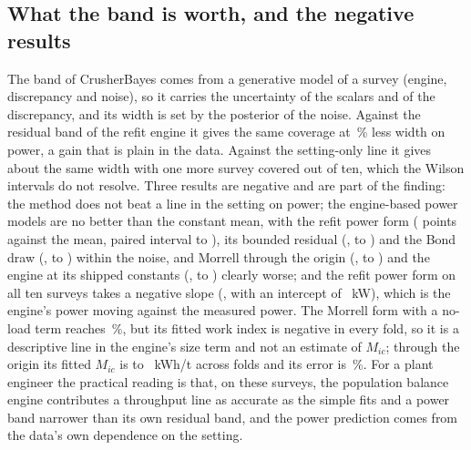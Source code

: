 \documentclass[journal]{IEEEtran}
\newcommand{\pct}{\,\%}
\begin{document}
\subsection{What the band is worth, and the negative results}

The band of CrusherBayes comes from a generative model of a survey (engine, discrepancy and noise), so it carries the
uncertainty of the scalars and of the discrepancy, and its width is set by the posterior of the noise. Against the
residual band of the refit engine it gives the same coverage at \widthRedKw\pct{} less width on power, a gain that is plain
in the data. Against the setting-only line it gives about the same width with one more survey covered out of ten, which
the Wilson intervals do not resolve. Three results are negative and are part of the finding: the method does not beat a
line in the setting on power; the engine-based power models are no better than the constant mean, with the refit power
form (\vsConstBackKw{} points against the mean, paired interval \vsConstBackKwLo{} to \vsConstBackKwHi), its bounded
residual (\vsConstResidKw, \vsConstResidKwLo{} to \vsConstResidKwHi) and the Bond draw (\vsConstBondKw, \vsConstBondKwLo{}
to \vsConstBondKwHi) within the noise, and Morrell through the origin (\vsConstMorKw, \vsConstMorKwLo{} to
\vsConstMorKwHi) and the engine at its shipped constants (\vsConstPubKw, \vsConstPubKwLo{} to \vsConstPubKwHi) clearly
worse; and the refit power form on all ten surveys takes a negative
slope (, with an intercept of ~kW), which is the engine's power moving against the measured power. The
Morrell form with a no-load term reaches \mnlKwMapeBoot\pct, but its fitted work index is negative in every fold, so it is
a descriptive line in the engine's size term and not an estimate of $M_{ic}$; through the origin its fitted $M_{ic}$ is
\micMin{} to \micMax~kWh/t across folds and its error is \morKwMapeBoot\pct. For a plant engineer the practical reading is
that, on these surveys, the population balance engine contributes a throughput line as accurate as the simple fits and a
power band narrower than its own residual band, and the power prediction comes from the data's own dependence on the
setting.
\end{document}
